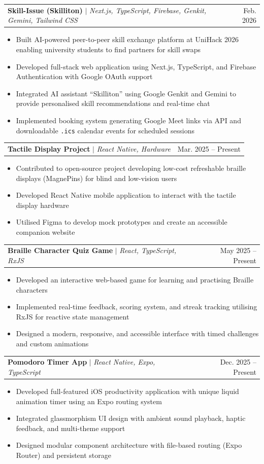 \documentclass[letterpaper,11pt]{article}
\makeatletter
\newcommand{\resumeItem}[1]{
  \item\small{
    {#1 \vspace{-2pt}}
  }
}
\newcommand{\resumeProjectHeading}[2]{
    \item
    \begin{tabular*}{0.97\textwidth}{l@{\extracolsep{\fill}}r}
      \small#1 & #2 \\
    \end{tabular*}\vspace{-7pt}
}
\newcommand{\resumeItemListStart}{\begin{itemize}}
\newcommand{\resumeItemListEnd}{\end{itemize}\vspace{-5pt}}
\makeatother
\begin{document}
      \resumeProjectHeading
          {\textbf{Skill-Issue (Skilliton)} $|$ \emph{Next.js, TypeScript, Firebase, Genkit, Gemini, Tailwind CSS}}{Feb. 2026}
          \resumeItemListStart
            \resumeItem{Built AI-powered peer-to-peer skill exchange platform at UniHack 2026 enabling university students to find partners for skill swaps}
            \resumeItem{Developed full-stack web application using Next.js, TypeScript, and Firebase Authentication with Google OAuth support}
            \resumeItem{Integrated AI assistant ``Skilliton'' using Google Genkit and Gemini to provide personalised skill recommendations and real-time chat}
            \resumeItem{Implemented booking system generating Google Meet links via API and downloadable \texttt{.ics} calendar events for scheduled sessions}
          \resumeItemListEnd

      \resumeProjectHeading
          {\textbf{Tactile Display Project} $|$ \emph{React Native, Hardware}}{Mar. 2025 -- Present}
          \resumeItemListStart
            \resumeItem{Contributed to open-source project developing low-cost refreshable braille displays (MagnePins) for blind and low-vision users}
            \resumeItem{Developed React Native mobile application to interact with the tactile display hardware}
            \resumeItem{Utilised Figma to develop mock prototypes and create an accessible companion website}
          \resumeItemListEnd

      \resumeProjectHeading
          {\textbf{Braille Character Quiz Game} $|$ \emph{React, TypeScript, RxJS}}{May 2025 -- Present}
          \resumeItemListStart
            \resumeItem{Developed an interactive web-based game for learning and practising Braille characters}
            \resumeItem{Implemented real-time feedback, scoring system, and streak tracking utilising RxJS for reactive state management}
            \resumeItem{Designed a modern, responsive, and accessible interface with timed challenges and custom animations}
          \resumeItemListEnd

      \resumeProjectHeading
          {\textbf{Pomodoro Timer App} $|$ \emph{React Native, Expo, TypeScript}}{Dec. 2025 -- Present}
          \resumeItemListStart
            \resumeItem{Developed full-featured iOS productivity application with unique liquid animation timer using an Expo routing system}
            \resumeItem{Integrated glassmorphism UI design with ambient sound playback, haptic feedback, and multi-theme support}
            \resumeItem{Designed modular component architecture with file-based routing (Expo Router) and persistent storage}
          \resumeItemListEnd
\end{document}
